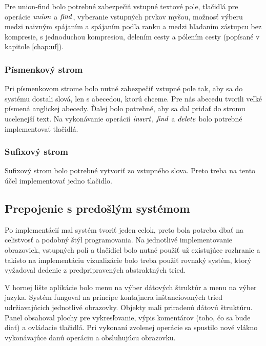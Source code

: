 Pre union-find bolo potrebné zabezpečiť vstupné textové pole, tlačidlá pre 
operácie $\mathop{\mathit{union}}$ a $\mathop{\mathit{find}}$, vyberanie vstupných prvkov myšou, možnosť výberu 
medzi naivným spájaním a spájaním podľa ranku a medzi hľadaním zástupcu bez 
kompresie, s jednoduchou kompresiou, delením cesty a pólením cesty (popísané 
v kapitole \ref{chap:uf}).

\subsubsection{Písmenkový strom}

Pri písmenkovom strome bolo nutné zabezpečiť vstupné pole tak, aby sa do systému 
dostali slová, len s abecedou, ktorú chceme. Pre nás abecedu tvorili veľké 
písmená anglickej abecedy. Ďalej bolo potrebné, aby sa dal pridať do stromu 
ucelenejší text. Na vykonávanie operácií $\mathop{\mathit{insert}}$, $\mathop{\mathit{find}}$ a $\mathop{\mathit{delete}}$ bolo 
potrebné implementovať tlačidlá.

\subsubsection{Sufixový strom}

Sufixový strom bolo potrebné vytvoriť zo vstupného slova. Preto treba na tento 
účel implementovať jedno tlačidlo.

\subsection{Prepojenie s predošlým systémom}

Po implementácií mal systém tvoriť jeden celok, preto bola potreba dbať na 
celistvosť a podobný štýl programovania. Na jednotlivé implementovanie 
obrazoviek, vstupných polí a tlačidiel bolo nutné použiť už existujúce 
rozhranie a takisto na implementáciu vizualizácie bolo treba použiť rovnaký 
systém, ktorý vyžadoval dedenie z predpripravených abstraktných tried. 

V hornej lište aplikácie bolo menu na výber dátových štruktúr a menu 
na výber jazyka. Systém fungoval na princípe kontajnera inštanciovaných tried 
udržiavajúcich jednotlivé obrazovky. Objekty mali priradenú dátovú štruktúru. 
Panel obsahoval plochy pre vykresľovanie, výpis komentárov (toho, čo sa bude 
diať) a ovládacie tlačidlá. Pri vykonaní zvolenej operácie sa spustilo nové 
vlákno vykonávajúce danú operáciu a obsluhujúcu obrazovku.

